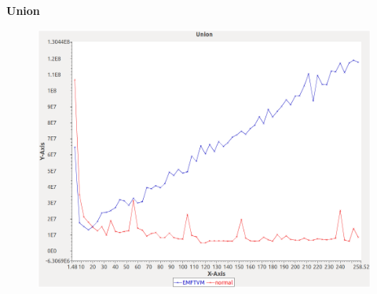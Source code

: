 \noindent\textbf{Union}

\begin{figure}[h]
\centering
\includegraphics[width=\textwidth]{../graphs/sequence/Union}
\end{figure}
\pagebreak
